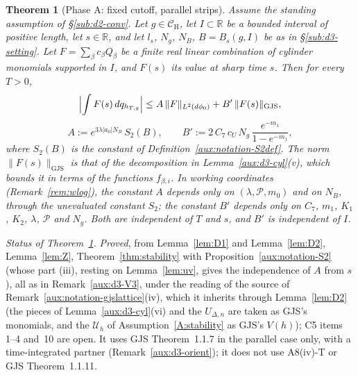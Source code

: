 \documentclass[11pt,a4paper]{article}
\theoremstyle{plain}
\newtheorem{theorem}{Theorem}[section]
\theoremstyle{definition}
\theoremstyle{plain}
\theoremstyle{definition}
\newcommand{\R}{\mathbb{R}}
\newcommand{\CH}{\mathcal{C}_{\mathrm H}}
\newcommand{\GJS}[1]{\lVert #1\rVert_{\mathrm{GJS}}}   %
\newcommand{\Uc}{\mathcal U}
\newcommand{\dphi}{d\phi_0}
\begin{document}
\begin{theorem}[Phase A: fixed cutoff, parallel strips]\label{thm:D3}
Assume the standing assumption of \S\ref{sub:d2-conv}.  Let $g\in\CH$, let $I\subset\R$ be a
bounded interval of positive length, let $s\in\R$, and let $l_s$, $N_g$, $N_B$, $B=B_s(g,I)$ be
as in \S\ref{sub:d3-setting}.  Let $F=\sum_\beta c_\beta Q_\beta$ be a finite real linear
combination of cylinder monomials supported in $I$, and $F(s)$ its value at sharp time $s$.
Then for every $T>0$,
\[
 \Bigl|\int F(s)\,dq_{h_{T,g}}\Bigr|\le A\,\|F\|_{L^2(\dphi)}+B'\,\GJS{F(s)} ,
\]
\[
 A:=e^{3\lambda|a_0|N_B}\,S_2(B),\qquad
 B':=2\,C_7\,c_U\,N_g\,\frac{e^{-m_1}}{1-e^{-m_1}} ,
\]
where $S_2(B)$ is the constant of Definition~\ref{aux:notation-S2def}.  The norm $\GJS{F(s)}$
is that of the decomposition in Lemma~\ref{aux:d3-cyl}(v), which bounds it in terms of the
functions $f_{\beta,i}$.  In working coordinates (Remark~\ref{rem:wlog}), the constant $A$
depends only on $(\lambda,\mathscr P,m_0)$ and on $N_B$, through the unevaluated constant $S_2$;
the constant $B'$ depends only on $C_7$, $m_1$, $K_1$, $K_2$, $\lambda$, $\mathscr P$ and $N_g$.
Both are independent of $T$ and $s$, and $B'$ is independent of $I$.
\end{theorem}

\emph{Status of Theorem~\ref{thm:D3}.}  \emph{Proved}, from Lemma~\ref{lem:D1} and
Lemma~\ref{lem:D2}, Lemma~\ref{lem:Z}, Theorem~\ref{thm:stability} with
Proposition~\ref{aux:notation-S2} (whose part (iii), resting on Lemma~\ref{lem:uv}, gives the
independence of $A$ from $s$), all as in Remark~\ref{aux:d3-V3}, under the reading of the source
of Remark~\ref{aux:notation-gjslattice}(iv), which it inherits through Lemma~\ref{lem:D2} (the
pieces of Lemma~\ref{aux:d3-cyl}(vi) and the $U_{\Delta,n}$ are taken as GJS's monomials, and the
$\Uc_h$ of Assumption~\ref{A:stability} as GJS's $V(h)$); C5 items 1--4 and~10 are open.  It uses
GJS Theorem~1.1.7 in the parallel case only, with a time-integrated partner
(Remark~\ref{aux:d3-orient}); it does not use A8(iv)-T or GJS Theorem~1.1.11.
\end{document}
